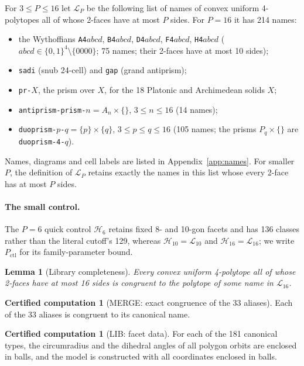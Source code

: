 \documentclass[11pt]{article}
\newtheorem{lemma}[theorem]{Lemma}
\theoremstyle{definition}
\newtheorem{computation}[theorem]{Certified computation}
\theoremstyle{remark}
\begin{document}
\begin{appendices}
For $3\le P\le16$ let $\mathcal L_P$ be the following list of names of convex
uniform 4-polytopes all of whose 2-faces have at most $P$ sides. For
$P=16$ it has 214 names:
\begin{itemize}[leftmargin=2em]
\item the Wythoffians \texttt{A4}$abcd$, \texttt{B4}$abcd$, \texttt{D4}$abcd$,
  \texttt{F4}$abcd$, \texttt{H4}$abcd$ ($abcd\in\{0,1\}^4\setminus\{0000\}$;
  75 names; their 2-faces have at most 10 sides);
\item \texttt{sadi} (snub 24-cell) and \texttt{gap} (grand antiprism);
\item \texttt{pr-}$X$, the prism over $X$, for the 18 Platonic and
  Archimedean solids $X$;
\item \texttt{antiprism-prism-}$n=A_n\times\{\}$, $3\le n\le16$ (14 names);
\item \texttt{duoprism-}$p$\texttt{-}$q=\{p\}\times\{q\}$, $3\le p\le q\le16$
  (105 names; the prisms $P_q\times\{\}$ are \texttt{duoprism-4-}$q$).
\end{itemize}
Names, diagrams and cell labels are listed in Appendix~\ref{app:names}.
For smaller $P$, the definition of $\mathcal L_P$ retains exactly the names
in this list whose every 2-face has at most $P$ sides.

\paragraph{The small control.}\label{sec:control-library}
The $P=6$ quick control $\mathcal H_6$ retains fixed 8- and 10-gon facets
and has 136 classes rather than the literal cutoff's 129, whereas
$\mathcal H_{10}=\mathcal L_{10}$ and $\mathcal H_{16}=\mathcal L_{16}$;
we write $P_{\mathrm{ctl}}$ for its family-parameter bound.


\begin{lemma}[Library completeness]\label{lem:A7}
Every convex uniform 4-polytope all of whose 2-faces have at most 16
sides is congruent to the polytope of some name in $\mathcal L_{16}$.
\end{lemma}

\begin{computation}[MERGE: exact congruence of the 33 aliases]\label{comp:merge}
Each of the 33 aliases is congruent to its canonical name.
\end{computation}

\begin{computation}[LIB: facet data]\label{comp:lib}
For each of the 181 canonical types, the circumradius and the dihedral
angles of all polygon orbits are enclosed in balls, and the model is
constructed with all coordinates enclosed in balls.
\end{computation}


\end{appendices}
\end{document}
